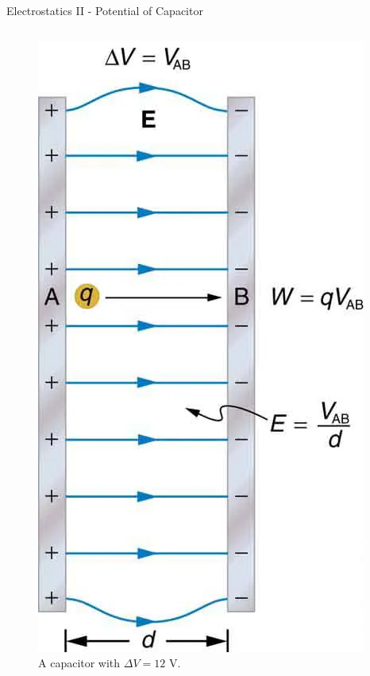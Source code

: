 \documentclass{beamer}
\begin{document}
\begin{frame}{Electrostatics II - Potential of Capacitor}
\begin{columns}[T]
\begin{column}{0.275\textwidth}
\begin{figure}
\includegraphics[width=\textwidth]{figures/cap2.png}
\caption{\label{fig:cap2} A capacitor with $\Delta V = 12$ V.}
\end{figure}
\end{column}
\end{columns}
\end{frame}
\end{document}
